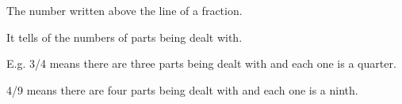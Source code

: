 The number written above the line of a fraction.  
\par
It tells of the numbers of parts being dealt with.  
\par
E.g. 3/4 means there are three parts being dealt with and each one is a quarter.
\par
4/9 means there are four parts being dealt with and each one is a ninth.
